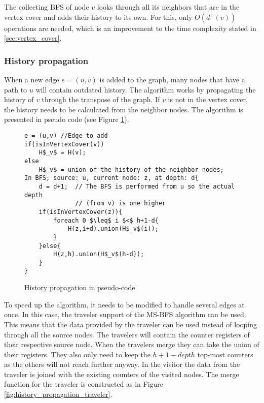 The collecting BFS of node $v$ looks through all its neighbors that are in the vertex cover and adds their history to its own. For this, only $O(d^+(v))$ operations are needed, which is an improvement to the time complexity stated in \ref{sec:vertex_cover}. \\


\subsubsection{History propagation}

When a new edge $e = (u,v)$ is added to the graph, many nodes that have a path to $u$ will contain outdated history. The algorithm works by propagating the history of $v$ through the transpose of the graph. If $v$ is not in the vertex cover, the history needs to be calculated from the neighbor nodes. The algorithm is presented in pseudo code (see Figure \ref{fig:history_propagation_algorithm}).

\begin{figure}[h]
    \begin{lstlisting}[mathescape]
e = (u,v) //Edge to add
if(isInVertexCover(v))
    H$_v$ = H(v);
else
    H$_v$ = union of the history of the neighbor nodes;
In BFS; source: u, current node: z, at depth: d{
    d = d+1;  // The BFS is performed from u so the actual depth 
              // (from v) is one higher
    if(isInVertexCover(z)){
        foreach 0 $\leq$ i $<$ h+1-d{
            H(z,i+d).union(H$_v$(i));
        }
    }else{
        H(z,h).union(H$_v$(h-d));
    }
}
    \end{lstlisting}
    \caption{History propagation in pseudo-code}
    \label{fig:history_propagation_algorithm}
\end{figure}

To speed up the algorithm, it needs to be modified to handle several edges at once. In this case, the traveler support of the MS-BFS algorithm can be used. This means that the data provided by the traveler can be used instead of looping through all the source nodes. The travelers will contain the counter registers of their respective source node. When the travelers merge they can take the union of their registers. They also only need to keep the $h+1-depth$ top-most counters as the others will not reach further anyway. In the visitor the data from the traveler is joined with the existing counters of the visited nodes. The merge function for the traveler is constructed as in Figure \ref{fig:history_propagation_traveler}.


